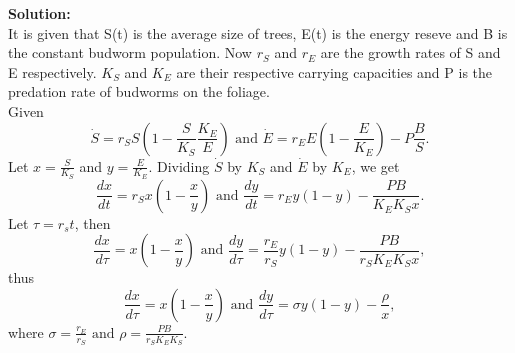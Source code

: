 \documentclass[12pt]{article}
\begin{document}
	{\bf Solution:}\\
	 It is given that S(t) is the average size of trees, E(t) is the energy reseve and B is the constant budworm population. Now $r_S$ and $r_E$ are the growth rates of S and E respectively. $K_S$ and $K_E$ are their respective carrying capacities and P is the predation rate of budworms on the foliage.\\
	Given
	$$\dot{S}=r_SS(1-\frac{S}{K_S}\frac{K_E}{E}) \text{ and } \dot{E}=r_EE(1-\frac{E}{K_E}) - P\frac{B}{S}.$$
	Let $x=\frac{S}{K_S}$ and $y=\frac{E}{K_E}$. Dividing $\dot{S}$ by $K_S$ and $\dot{E}$ by $K_E$, we get
	$$\frac{dx}{dt} = r_Sx(1-\frac{x}{y}) \text{ and } \frac{dy}{dt} = r_Ey(1-y) - \frac{PB}{K_EK_Sx}.$$
	Let $\tau = r_st$, then
	$$\frac{dx}{d\tau} = x(1-\frac{x}{y}) \text{ and } \frac{dy}{d\tau} = \frac{r_E}{r_S}y(1-y) - \frac{PB}{r_SK_EK_Sx},$$
	thus
	$$\frac{dx}{d\tau} = x(1-\frac{x}{y}) \text{ and } \frac{dy}{d\tau} = \sigma y(1-y) - \frac{\rho}{x},$$
	where $\sigma = \frac{r_E}{r_S} \text{ and } \rho = \frac{PB}{r_SK_EK_S}$.\\
	\bigskip
	
\end{document}
